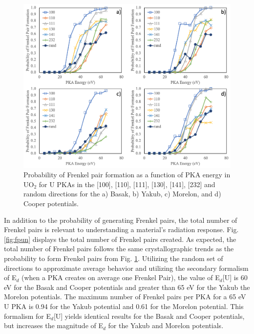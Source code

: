 \documentclass[review]{elsarticle}
\begin{document}
\begin{figure}[h]
 \centering
 \includegraphics[width=1.0\textwidth]{FP_U.png}
 \caption{Probability of Frenkel pair formation as a function of PKA energy in UO$_2$ for U PKAs in the [100], [110], [111], [130], [141], [232] and random directions for the a) Basak, b) Yakub, c) Morelon, and d) Cooper potentials. }
 \label{fig:fpu}
\end{figure}

\FloatBarrier

In addition to the probability of generating Frenkel pairs, the total number of Frenkel pairs is relevant to understanding a material's radiation response. Fig. \ref{fig:fpun} displays the total number of Frenkel pairs created. As expected, the total number of Frenkel pairs follows the same crystallographic trends as the probability to form Frenkel pairs from Fig. \ref{fig:fpu}. Utilizing the random set of directions to approximate average behavior and utilizing the secondary formalism of E$_d$ (when a PKA creates on average one Frenkel Pair), the value of E$_d$[U] is 60 eV for the Basak and Cooper potentials and greater than 65 eV for the Yakub the Morelon potentials. The maximum number of Frenkel pairs per PKA for a 65 eV U PKA is 0.94 for the Yakub potential and 0.61 for the Morelon potential. This formalism for E$_d$[U] yields identical results for the Basak and Cooper potentials, but increases the magnitude of E$_d$ for the Yakub and Morelon potentials.
\end{document}
